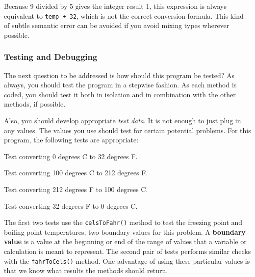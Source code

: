 \noindent Because 9 divided by 5 gives the integer result 1, this
expression is always equivalent to {\tt temp + 32}, which is not the
correct conversion formula.  This kind of subtle semantic error
can be avoided if you avoid mixing types wherever possible.


\subsubsection*{Testing and Debugging}

\noindent The next question to be addressed is how should 
this program be tested? As always, you should test
the program in a stepwise fashion.  As each method is coded, you
should test it both in isolation and in combination with the other
methods, if \mbox{possible.}

Also, you should develop appropriate {\it test data}.
It is not enough to just plug in any values.  The values you use should
test for certain potential problems.  For this program, the following
tests are appropriate:

\begin{BL}
\item  Test converting 0 degrees C to 32 degrees F.
\item  Test converting 100 degrees C to 212 degrees F.
\item  Test converting 212 degrees F to 100 degrees C.
\item  Test converting 32 degrees F to 0 degrees C.
\end{BL}

\noindent The first two tests use the {\tt celsToFahr()} method
to test the freezing point and boiling point temperatures, two
boundary values for this problem. A {\bf boundary value} is a value at
the beginning or end of the range of values that a variable or
calculation is meant to represent.  The second pair of tests performs
similar checks with the {\tt fahrToCels()} method.  One advantage of
using these particular values is that we know what results the methods
should return.

